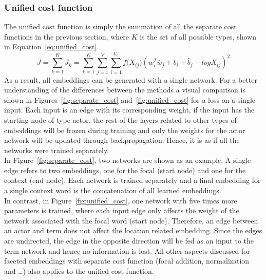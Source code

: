 \subsubsection{Unified cost function  }
\label{sec:unified_cost}
The unified cost function is simply the summation of all the separate cost functions in the previous section, where $K$ is the set of all possible types, shown in Equation~\ref{eq:unified_cost}.
\begin{equation}
J=\sum _{ k=1 }^{ K }{J_k}=\sum _{ k=1 }^{ K }{}\sum _{ j=1 }^{ V }{}\sum _{ i=1 }^{ V_e }{ f({ X }_{ ij } } )(w_{ i }^{ T }\tilde{  w_{ j } } +b_{ i }+\tilde{  b_{ j } } -log{ X }_{ ij })^2
\label{eq:unified_cost}
\end{equation}
As a result, all embeddings can be generated with a single network. For a better understanding of the differences between the methods a visual comparison is shown in Figures~\ref{fig:separate_cost} and~\ref{fig:unified_cost} for a loss on a single input. Each input is an edge with its corresponding weight, if the input has the starting node of type actor, the rest of the layers related to other types of embeddings will be frozen during training and only the weights for the actor network will be updated through backpropagation. Hence, it is as if all the networks were trained separately.  \\
In Figure~\ref{fig:separate_cost}, two networks are shown as an example. A single edge refers to two embeddings, one for the focal (start node) and one for the context (end node). Each network is trained separately and a final embedding for a single context word is the concatenation of all learned embeddings. \\
In contrast, in Figure~\ref{fig:unified_cost}, one network with five times more parameters is trained, where each input edge only affects the weight of the network associated with the focal word (start node). Therefore, an edge between an actor and term does not affect the location related embedding. Since the edges are undirected, the edge in the opposite direction will be fed as an input to the term network and hence no information is lost. All other aspects discussed for faceted embeddings with separate cost function (focal addition, normalization and \dots) also applies to the unified cost function. 
